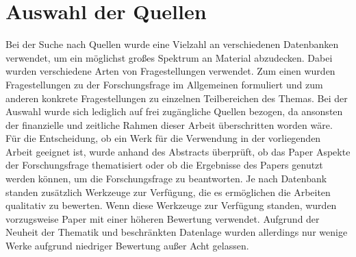 \section{Auswahl der Quellen}
Bei der Suche nach Quellen wurde eine Vielzahl an verschiedenen Datenbanken verwendet, um ein möglichst großes 
Spektrum an Material abzudecken. Dabei wurden verschiedene Arten von Fragestellungen verwendet. Zum einen wurden 
Fragestellungen zu der Forschungsfrage im Allgemeinen formuliert und zum anderen konkrete Fragestellungen zu einzelnen 
Teilbereichen des Themas. Bei der Auswahl wurde sich lediglich auf frei zugängliche Quellen bezogen, da ansonsten der 
finanzielle und zeitliche Rahmen dieser Arbeit überschritten worden wäre. Für die Entscheidung, ob ein Werk für die 
Verwendung in der vorliegenden Arbeit geeignet ist, wurde anhand des Abstracts überprüft, ob das Paper Aspekte der 
Forschungsfrage thematisiert oder ob die Ergebnisse des Papers genutzt werden können, um die Forschungsfrage zu beantworten. 
Je nach Datenbank standen zusätzlich Werkzeuge zur Verfügung, die es ermöglichen die Arbeiten qualitativ zu bewerten. 
Wenn diese Werkzeuge zur Verfügung standen, wurden vorzugsweise Paper mit einer höheren Bewertung verwendet. Aufgrund der 
Neuheit der Thematik und beschränkten Datenlage wurden allerdings nur wenige Werke aufgrund niedriger Bewertung außer Acht gelassen.


